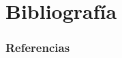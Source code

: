 \section{Bibliografía}

\begin{frame}[fragile, label=biblio]
\frametitle{Referencias}
\printbibliography
\end{frame}